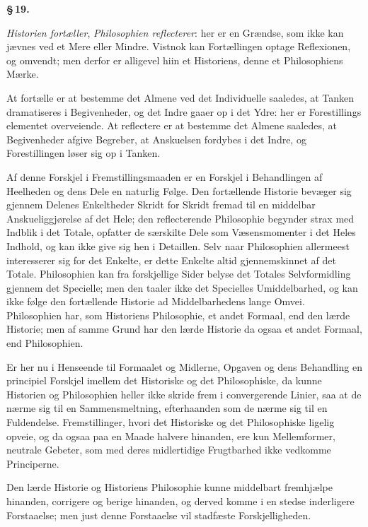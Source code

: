 \documentclass[12pt]{book}
\newcommand{\opage}[1]{\marginnote{\footnotesize\textit{[#1]}}}
\begin{document}
\begin{center}{\bfseries \S\,19.}\end{center}

\emph{Historien fortæller}, \emph{Philosophien reflecterer}: her er en Grændse, som ikke kan
jævnes ved et Mere eller Mindre. Vistnok kan Fortællingen optage Reflexionen, og omvendt;
men derfor er alligevel hiin et Historiens, denne et Philosophiens Mærke.

At fortælle er at bestemme det Almene ved det Individuelle saaledes, at Tanken dramatiseres
i Begivenheder, og det Indre gaaer op i det Ydre: her er Forestillings%
\opage{89}elementet overveiende. At reflectere er at bestemme det Almene saaledes, at Begivenheder
afgive Begreber, at Anskuelsen fordybes i det Indre, og Forestillingen løser sig op i
Tanken.

Af denne Forskjel i Fremstillingsmaaden er en Forskjel i Behandlingen af Heelheden og dens
Dele en naturlig Følge. Den fortællende Historie bevæger sig gjennem Delenes Enkeltheder
Skridt for Skridt fremad til en middelbar Anskueliggjørelse af det Hele; den reflecterende
Philosophie begynder strax med Indblik i det Totale, opfatter de særskilte Dele som
Væsensmomenter i det Heles Indhold, og kan ikke give sig hen i Detaillen. Selv naar
Philosophien allermeest interesserer sig for det Enkelte, er dette Enkelte altid
gjennemskinnet af det Totale. Philosophien kan fra forskjellige Sider belyse det Totales
Selvformidling gjennem det Specielle; men den taaler ikke det Specielles Umiddelbarhed, og
kan ikke følge den fortællende Historie ad Middelbarhedens lange Omvei. Philosophien har,
som Historiens Philosophie, et andet Formaal, end den lærde Historie; men af samme Grund
har den lærde Historie da ogsaa et andet Formaal, end Philosophien.

Er her nu i Henseende til Formaalet og Midlerne, Opgaven og dens Behandling en principiel
Forskjel imellem det Historiske og det Philosophiske, da kunne Historien og Philosophien
heller ikke skride frem i convergerende Linier, saa at de nærme sig til en Sammensmeltning,
efterhaanden som de nærme sig til en Fuldendelse. Fremstillinger, hvori det Historiske og
det Philosophiske ligelig opveie, og da ogsaa paa en Maade halvere hinanden, ere kun
Mellemformer, neutrale Gebeter, som med deres midlertidige Frugtbarhed ikke vedkomme
Principerne.

Den lærde Historie og Historiens Philosophie kunne middelbart fremhjælpe hinanden,
corrigere og berige hinanden, og derved komme i en stedse inderligere Forstaaelse; men just
denne Forstaaelse vil stadfæste Forskjelligheden.
\end{document}
